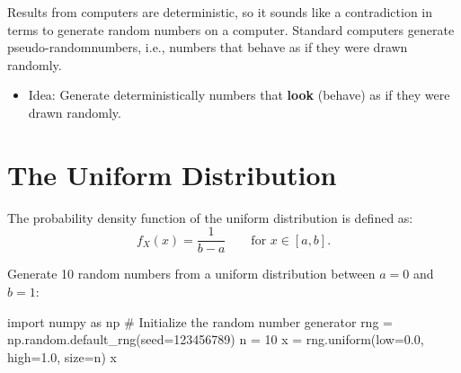 \documentclass[
  letterpaper,
  DIV=11,
  numbers=noendperiod]{scrreprt}
\newenvironment{Shaded}{\begin{snugshade}}{\end{snugshade}}
\newcommand{\CommentTok}[1]{\textcolor[rgb]{0.37,0.37,0.37}{#1}}
\newcommand{\DecValTok}[1]{\textcolor[rgb]{0.68,0.00,0.00}{#1}}
\newcommand{\FloatTok}[1]{\textcolor[rgb]{0.68,0.00,0.00}{#1}}
\newcommand{\ImportTok}[1]{\textcolor[rgb]{0.00,0.46,0.62}{#1}}
\newcommand{\NormalTok}[1]{\textcolor[rgb]{0.00,0.23,0.31}{#1}}
\newcommand{\OperatorTok}[1]{\textcolor[rgb]{0.37,0.37,0.37}{#1}}
\providecommand{\tightlist}{%
  \setlength{\itemsep}{0pt}\setlength{\parskip}{0pt}}\usepackage{longtable,booktabs,array}
\begin{document}
Results from computers are deterministic, so it sounds like a
contradiction in terms to generate random numbers on a computer.
Standard computers generate pseudo-randomnumbers, i.e., numbers that
behave as if they were drawn randomly.

\begin{tcolorbox}[enhanced jigsaw, opacityback=0, left=2mm, title=\textcolor{quarto-callout-note-color}{\faInfo}\hspace{0.5em}{Deterministic Random Numbers}, bottomrule=.15mm, titlerule=0mm, arc=.35mm, leftrule=.75mm, colbacktitle=quarto-callout-note-color!10!white, bottomtitle=1mm, opacitybacktitle=0.6, coltitle=black, colframe=quarto-callout-note-color-frame, toprule=.15mm, breakable, colback=white, toptitle=1mm, rightrule=.15mm]

\begin{itemize}
\tightlist
\item
  Idea: Generate deterministically numbers that \textbf{look} (behave)
  as if they were drawn randomly.
\end{itemize}

\end{tcolorbox}

\hypertarget{the-uniform-distribution}{%
\section{The Uniform Distribution}\label{the-uniform-distribution}}

The probability density function of the uniform distribution is defined
as: \[
f_X(x) = \frac{1}{b-a} \qquad \text{for $x \in [a,b]$}.
\]

Generate 10 random numbers from a uniform distribution between \(a=0\)
and \(b=1\):

\begin{Shaded}
\begin{Highlighting}[]
\ImportTok{import}\NormalTok{ numpy }\ImportTok{as}\NormalTok{ np}
\CommentTok{\# Initialize the random number generator}
\NormalTok{rng }\OperatorTok{=}\NormalTok{ np.random.default\_rng(seed}\OperatorTok{=}\DecValTok{123456789}\NormalTok{)}
\NormalTok{n }\OperatorTok{=} \DecValTok{10}
\NormalTok{x }\OperatorTok{=}\NormalTok{ rng.uniform(low}\OperatorTok{=}\FloatTok{0.0}\NormalTok{, high}\OperatorTok{=}\FloatTok{1.0}\NormalTok{, size}\OperatorTok{=}\NormalTok{n)}
\NormalTok{x}
\end{Highlighting}
\end{Shaded}
\end{document}
